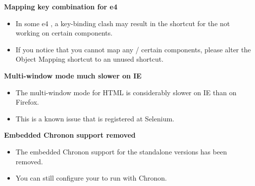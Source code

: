 \textbf{Mapping key combination for e4 \gdauts{}}
\begin{itemize}
\item In some e4 \gdauts{}, a key-binding clash may result in the shortcut for the \gdomm{} not working on certain components. 
\item If you notice that you cannot map any / certain components, please alter the Object Mapping shortcut to an unused shortcut. 
\end{itemize}

\textbf{Multi-window mode much slower on IE}
\begin{itemize}
\item The multi-window mode for HTML \gdauts{} is considerably slower on IE than on Firefox.
\item This is a known issue that is registered at Selenium. 
\end{itemize}

\textbf{Embedded Chronon support removed}
\begin{itemize}
\item The embedded Chronon support for the standalone versions has been removed.
\item You can still configure your \gdaut{} to run with Chronon.
\end{itemize}
